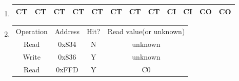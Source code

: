 \documentclass{article}
\begin{document}
\begin{enumerate}[label=\textbf{\Alph*.}]
	\item 
\begin{tabular}{|c|c|c|c|c|c|c|c|c|c|c|c|}
	\hline
	CT & CT & CT & CT & CT & CT & CT & CT & CI & CI & CO & CO \\
	\hline
\end{tabular}
\item
	\begin{tabular}{c c c c}
		Operation & Address & Hit? & Read value(or unknown) \\
		Read & 0x834 & N & unknown \\
		Write & 0x836 & Y & unknown \\
		Read & 0xFFD & Y & C0
	\end{tabular}
\end{enumerate}
\end{document}
